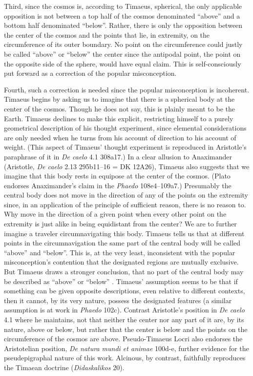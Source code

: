 Third, since the cosmos is, according to Timaeus, spherical, the only applicable opposition is not between a top half of the cosmos denominated ``above'' and a bottom half denominated ``below''. Rather, there is only the opposition between the center of the cosmos and the points that lie, in extremity, on the circumference of its outer boundary. No point on the circumference could justly be called ``above'' or ``below'' the center since the antipodal point, the point on the opposite side of the sphere, would have equal claim. This is self-consciously put forward as a correction of the popular misconception.

Fourth, such a correction is needed since the popular misconception is incoherent. Timaeus begins by asking us to imagine that there is a spherical body at the center of the cosmos. Though he does not say, this is plainly meant to be the Earth. Timaeus declines to make this explicit, restricting himself to a purely geometrical description of his thought experiment, since elemental considerations are only needed when he turns from his account of direction to his account of weight. (This aspect of Timaeus' thought experiment is reproduced in Aristotle's paraphrase of it in \emph{De caelo} 4.1 308a17.) In a clear allusion to Anaximander (Aristotle, \emph{De caelo} 2.13 295b11--16 = DK 12A26), Timaeus also suggests that we imagine that this body rests in equipose at the center of the cosmos. (Plato endorses Anaximander's claim in the \emph{Phaedo} 108e4--109a7.) Presumably the central body does not move in the direction of any of the points on the extremity since, in an application of the principle of sufficient reason, there is no reason to. Why move in the direction of a given point when every other point on the extremity is just alike in being equidistant from the center? We are to further imagine a traveler circumnavigating this body. Timaeus tells us that at different points in the circumnavigation the same part of the central body will be called ``above'' and ``below''. This is, at the very least, inconsistent with the popular misconception's contention that the designated regions are mutually exclusive. But Timaeus draws a stronger conclusion, that no part of the central body may be described as ``above'' or ``below'' \citep[23--24]{OBrien:1984ji}. Timaeus' assumption seems to be that if something can be given opposite descriptions, even relative to different contexts, then it cannot, by its very nature, possess the designated features (a similar assumption is at work in \emph{Phaedo} 102c). Contrast Aristotle's position in \emph{De caelo} 4.1 where he maintains, not that neither the center nor any part of it are, by its nature, above or below, but rather that the center is below and the points on the circumference of the cosmos are above. Pseudo-Timaeus Locri also endorses the Aristotelian position, \emph{De natura mundi et animae} 100d-e, further evidence for the pseudepigraphal nature of this work. Alcinous, by contrast, faithfully reproduces the Timaean doctrine (\emph{Didaskalikos} 20).

